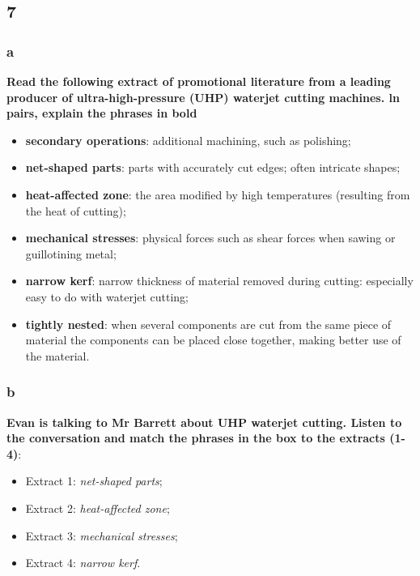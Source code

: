 \subsection{7}

\subsubsection{a}

\textbf{Read the following extract of promotional literature from a leading producer of ultra-high-pressure (UHP) waterjet cutting machines. ln pairs, explain the phrases in bold}

\begin{itemize}

\item\textbf{secondary operations}: additional machining, such as polishing;
\item\textbf{net-shaped parts}: parts with accurately cut edges; often intricate shapes;
\item\textbf{heat-affected zone}: the area modified by high temperatures (resulting from the heat of cutting);
\item\textbf{mechanical stresses}: physical forces such as shear forces when sawing or guillotining metal;
\item\textbf{narrow kerf}: narrow thickness of material removed during cutting: especially easy to do with waterjet cutting;
\item\textbf{tightly nested}: when several components are cut from the same piece of material the components can be placed close together, making better use of the material.

\end{itemize}

\subsubsection{b}

\textbf{Evan is talking to Mr Barrett about UHP waterjet cutting. Listen to the conversation and match the phrases in the box to the extracts (1-4)}:

\begin{itemize}

\item Extract 1: \textit{net-shaped parts};
\item Extract 2: \textit{heat-affected zone};
\item Extract 3: \textit{mechanical stresses};
\item Extract 4: \textit{narrow kerf}.

\end{itemize}

